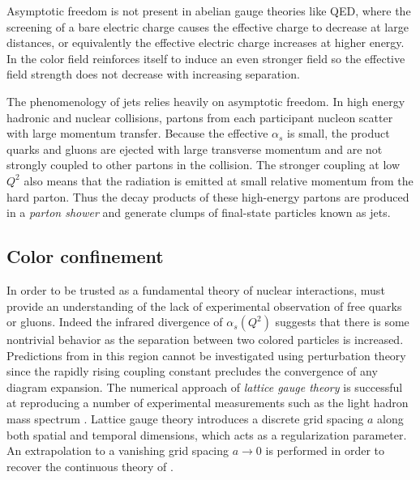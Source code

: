Asymptotic freedom is not present in abelian gauge theories like \ac{QED}, where the screening of a bare electric charge causes the effective charge to decrease at large distances, or equivalently the effective electric charge increases at higher energy.
In \qcd the color field reinforces itself to induce an even stronger field so the effective field strength does not decrease with increasing separation.

The phenomenology of jets relies heavily on asymptotic freedom.
In high energy hadronic and nuclear collisions, partons from each participant nucleon scatter with large momentum transfer.
Because the effective $\alpha_s$ is small, the product quarks and gluons are ejected with large transverse momentum and are not strongly coupled to other partons in the collision.
The stronger coupling at low $Q^2$ also means that the \qcd radiation is emitted at small relative momentum from the hard parton.
Thus the decay products of these high-energy partons are produced in a \emph{parton shower} and generate clumps of final-state particles known as jets.

\subsection{Color confinement}

In order to be trusted as a fundamental theory of nuclear interactions, \qcd must provide an understanding of the lack of experimental observation of free quarks or gluons.
Indeed the infrared divergence of $\alpha_s(Q^2)$ suggests that there is some nontrivial behavior as the separation between two colored particles is increased.
Predictions from \qcd in this region cannot be investigated using perturbation theory since the rapidly rising coupling constant precludes the convergence of any diagram expansion.
The numerical approach of \emph{lattice gauge theory} \cite{Aoki:2016frl} is successful at reproducing a number of experimental measurements such as the light hadron mass spectrum \cite{Durr:2008zz}.
Lattice gauge theory introduces a discrete grid spacing $a$ along both spatial and temporal dimensions, which acts as a regularization parameter.
An extrapolation to a vanishing grid spacing $a \rightarrow 0$ is performed in order to recover the continuous theory of \qcd.

